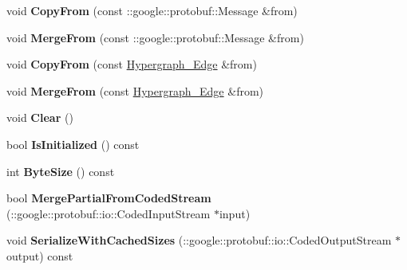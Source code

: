 \begin{DoxyCompactItemize}
\item 
\hypertarget{classHypergraph__Edge_a0f781d1a4bdef9ac8d60e93a5f7c2ec3}{
void {\bfseries CopyFrom} (const ::google::protobuf::Message \&from)}
\label{classHypergraph__Edge_a0f781d1a4bdef9ac8d60e93a5f7c2ec3}

\item 
\hypertarget{classHypergraph__Edge_a10b898c3321b1dc37977b452ac8e6f0e}{
void {\bfseries MergeFrom} (const ::google::protobuf::Message \&from)}
\label{classHypergraph__Edge_a10b898c3321b1dc37977b452ac8e6f0e}

\item 
\hypertarget{classHypergraph__Edge_a63ed56813c060988bc61a35ea30d216e}{
void {\bfseries CopyFrom} (const \hyperlink{classHypergraph__Edge}{Hypergraph\_\-Edge} \&from)}
\label{classHypergraph__Edge_a63ed56813c060988bc61a35ea30d216e}

\item 
\hypertarget{classHypergraph__Edge_a193be9b1c77ac3c955bedfd14581b88a}{
void {\bfseries MergeFrom} (const \hyperlink{classHypergraph__Edge}{Hypergraph\_\-Edge} \&from)}
\label{classHypergraph__Edge_a193be9b1c77ac3c955bedfd14581b88a}

\item 
\hypertarget{classHypergraph__Edge_a111b4c380a219239ea99a0803b1160b9}{
void {\bfseries Clear} ()}
\label{classHypergraph__Edge_a111b4c380a219239ea99a0803b1160b9}

\item 
\hypertarget{classHypergraph__Edge_a635fda95ae632d07889b53588d4352bc}{
bool {\bfseries IsInitialized} () const }
\label{classHypergraph__Edge_a635fda95ae632d07889b53588d4352bc}

\item 
\hypertarget{classHypergraph__Edge_a98114bd535825d90c7e28499f957c0f4}{
int {\bfseries ByteSize} () const }
\label{classHypergraph__Edge_a98114bd535825d90c7e28499f957c0f4}

\item 
\hypertarget{classHypergraph__Edge_aef6ab2097154d0ac22d50d0159f5610a}{
bool {\bfseries MergePartialFromCodedStream} (::google::protobuf::io::CodedInputStream $\ast$input)}
\label{classHypergraph__Edge_aef6ab2097154d0ac22d50d0159f5610a}

\item 
\hypertarget{classHypergraph__Edge_ac3aba45b607957f38bc9cc9eab5ef614}{
void {\bfseries SerializeWithCachedSizes} (::google::protobuf::io::CodedOutputStream $\ast$output) const }
\label{classHypergraph__Edge_ac3aba45b607957f38bc9cc9eab5ef614}


\end{DoxyCompactItemize}
